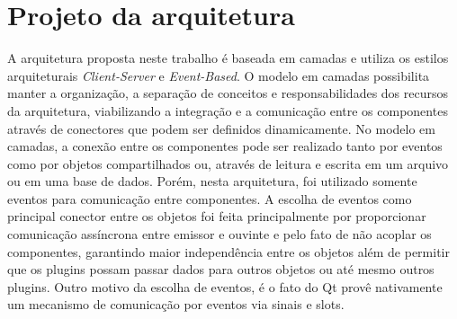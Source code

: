 \section{Projeto da arquitetura}
A arquitetura proposta neste trabalho é baseada em camadas e utiliza os estilos arquiteturais \textit{Client-Server} e \textit{Event-Based}. O modelo em camadas possibilita manter a organização, a separação de conceitos e responsabilidades dos recursos da arquitetura, viabilizando a integração e a comunicação entre os componentes através de conectores que podem ser definidos dinamicamente. No modelo em camadas, a conexão entre os componentes pode ser realizado tanto por eventos como por objetos compartilhados ou, através de leitura e escrita em um arquivo ou em uma base de dados. Porém, nesta arquitetura, foi utilizado somente eventos para comunicação entre componentes. A escolha de eventos como principal conector entre os objetos foi feita principalmente por proporcionar comunicação assíncrona entre emissor e ouvinte e pelo fato de não acoplar os componentes, garantindo maior independência entre os objetos além de permitir que os plugins possam passar dados para outros objetos ou até mesmo outros plugins. Outro motivo da escolha de eventos, é o fato do Qt provê nativamente um mecanismo de comunicação por eventos via sinais e slots.\par


